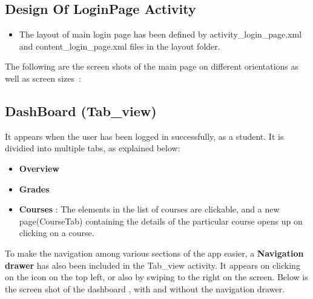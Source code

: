 \documentclass{article}
\begin{document}

\subsection{Design Of LoginPage Activity}
\begin{itemize}
\item The layout of main login page has been defined by activity\_login\_page.xml and content\_login\_page.xml files in the layout folder. 

\end{itemize} 

\par\noindent The following are the screen shots of the main page on different orientations as well as screen sizes~\cite{figures_in_latex}:



\subsection{DashBoard (Tab\_view)}
It appears when the user has been logged in successfully, as a student.
It is dividied into multiple tabs, as explained below:
\begin{itemize}
\item \textbf{Overview}
\item \textbf{Grades}
\item \textbf{Courses} : The elements in the list of courses are clickable, and a new page(CourseTab) containing the details of the particular course opens up on clicking on a course.
\end{itemize}
\par\noindent To make the navigation among various sections of the app easier, a \textbf{Navigation drawer} has also been included in the Tab\_view activity. It appears on clicking on the icon on the top left, or also by swiping to the right on the screen.
 Below is the screen shot of the dashboard , with and without the navigation drawer.
\end{document}
